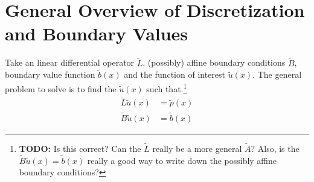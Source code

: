 \documentclass[11pt]{article}
\begin{document}
	\section{General Overview of Discretization and Boundary Values}\label{sec:general}
	Take an linear differential operator $\tilde{L}$, (possibly) affine boundary conditions $\tilde{B}$, boundary value function $\tilde{b}(x)$ and the function of interest $\tilde{u}(x)$.  The general problem to solve is to find the $\tilde{u}(x)$ such that.\footnote{\textbf{TODO:} Is this correct? Can the $\tilde{L}$ really be a more general $\tilde{A}$?  Also, is the $\tilde{B}\tilde{u}(x) = \tilde{b}(x)$ really a good way to write down the possibly affine boundary conditions?}
	\begin{align}
		\tilde{L} \tilde{u}(x) &= \tilde{p}(x)\label{eq:L-u-DE}\\
		\tilde{B} \tilde{u}(x) &= \tilde{b}(x)\label{eq:B-u-DE}
	\end{align}
\end{document}
